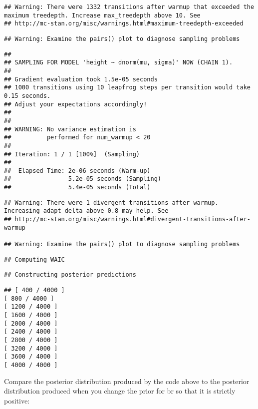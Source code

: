 \documentclass[]{article}
\begin{document}
\begin{verbatim}
## Warning: There were 1332 transitions after warmup that exceeded the maximum treedepth. Increase max_treedepth above 10. See
## http://mc-stan.org/misc/warnings.html#maximum-treedepth-exceeded
\end{verbatim}

\begin{verbatim}
## Warning: Examine the pairs() plot to diagnose sampling problems
\end{verbatim}

\begin{verbatim}
## 
## SAMPLING FOR MODEL 'height ~ dnorm(mu, sigma)' NOW (CHAIN 1).
## 
## Gradient evaluation took 1.5e-05 seconds
## 1000 transitions using 10 leapfrog steps per transition would take 0.15 seconds.
## Adjust your expectations accordingly!
## 
## 
## WARNING: No variance estimation is
##          performed for num_warmup < 20
## 
## Iteration: 1 / 1 [100%]  (Sampling)
## 
##  Elapsed Time: 2e-06 seconds (Warm-up)
##                5.2e-05 seconds (Sampling)
##                5.4e-05 seconds (Total)
\end{verbatim}

\begin{verbatim}
## Warning: There were 1 divergent transitions after warmup. Increasing adapt_delta above 0.8 may help. See
## http://mc-stan.org/misc/warnings.html#divergent-transitions-after-warmup

## Warning: Examine the pairs() plot to diagnose sampling problems
\end{verbatim}

\begin{verbatim}
## Computing WAIC
\end{verbatim}

\begin{verbatim}
## Constructing posterior predictions
\end{verbatim}

\begin{verbatim}
## [ 400 / 4000 ]
[ 800 / 4000 ]
[ 1200 / 4000 ]
[ 1600 / 4000 ]
[ 2000 / 4000 ]
[ 2400 / 4000 ]
[ 2800 / 4000 ]
[ 3200 / 4000 ]
[ 3600 / 4000 ]
[ 4000 / 4000 ]
\end{verbatim}

Compare the posterior distribution produced by the code above to the
posterior distribution produced when you change the prior for br so that
it is strictly positive:
\end{document}
